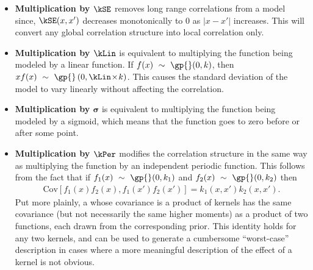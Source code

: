 \begin{itemize}
\item {\bf Multiplication by $\kSE$} removes long range correlations from a model since, $\kSE(x,x')$ decreases monotonically to 0 as $|x - x'|$ increases.
This will convert any global correlation structure into local correlation only.

\item {\bf Multiplication by $\kLin$} is equivalent to multiplying the function being modeled by a linear function.
If $f(x) \dist \gp{}(0, \kernel)$, then $xf(x) \dist \gp{}\left(0, \kLin \kerntimes k \right)$.
This causes the standard deviation of the model to vary linearly without affecting the correlation.

\item {\bf Multiplication by $\boldsymbol\sigma$} is equivalent to multiplying the function being modeled by a sigmoid, which means that the function goes to zero before or after some point.

\item {\bf Multiplication by $\kPer$}
modifies the correlation structure in the same way as multiplying the function by an independent periodic function.
This follows from the fact that if ${f_1(x) \dist \gp{}(0, \kernel_1)}$ and ${f_2(x) \dist \gp{}(0, \kernel_2)}$ then
\begin{align}
{\textrm{Cov} \left[f_1(x)f_2(x), f_1(x')f_2(x') \right] = k_1(x,x')k_2(x,x')}.
\end{align}
Put more plainly, a \gp{} whose covariance is a product of kernels has the same covariance (but not necessarily the same higher moments) as a product of two functions, each drawn from the corresponding \gp{} prior.
This identity holds for any two kernels, and can be used to generate a cumbersome ``worst-case'' description in cases where a more meaningful description of the effect of a kernel is not obvious.
\end{itemize}

